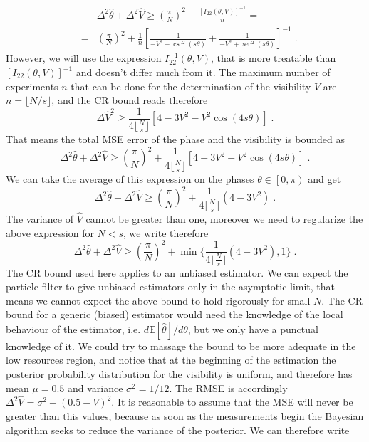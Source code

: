 \documentclass[aps, pra, 10pt, twocolumn, superscriptaddress,floatfix]{revtex4-1}
\begin{document}
%
\begin{eqnarray*}
	&& \Delta^2 \hat{\theta} + \Delta^2 \hat{V} \ge \left( \frac{\pi}{N} \right)^2 + \frac{\left[ I_{22}(\theta, V) \right]^{-1}}{n} = \\
	&=& \left( \frac{\pi}{N} \right)^2 + \frac{1}{n} \left[ \frac{1}{-V^2 + \csc^2(s \theta)} + \frac{1}{-V^2 + \sec^2(s \theta)} \right]^{-1} \; .
\end{eqnarray*}
%
However, we will use the expression $I^{-1}_{22}(\theta, V)$, that is more treatable than $\left[ I_{22}(\theta, V) \right]^{-1}$ and doesn't differ much from it. The maximum number of experiments $n$ that can be done for the determination of the visibility $V$ are $n=\lfloor N/s \rfloor$, and the CR bound reads therefore
%
\begin{equation}
	\Delta \hat{V}^2 \ge \frac{1}{4 \lfloor \frac{N}{s} \rfloor} \left[ 4 - 3 V^2 - V^2 \cos (4 s \theta) \right] \; .
\end{equation}
%
That means the total MSE error of the phase and the visibility is bounded as
%
\begin{equation}
	\Delta^2 \hat{\theta} + \Delta^2 \hat{V} \ge \left( \frac{\pi}{N} \right)^2 +  \frac{1}{4 \lfloor \frac{N}{s} \rfloor} \left[ 4 - 3 V^2 - V^2 \cos (4 s \theta) \right] \; .
\end{equation}
%
We can take the average of this expression on the phases $\theta \in \left[0, \pi \right)$ and get
%
\begin{equation}
	\Delta^2 \hat{\theta} + \Delta^2 \hat{V} \ge \left( \frac{\pi}{N} \right)^2 +  \frac{1}{4 \lfloor \frac{N}{s} \rfloor} \left( 4 - 3 V^2 \right) \; .
\end{equation}
%
The variance of $\hat{V}$ cannot be greater than one, moreover we need to regularize the above expression for $N < s$, we write therefore
%
\begin{equation}
	\Delta^2 \hat{\theta} + \Delta^2 \hat{V} \ge \left( \frac{\pi}{N} \right)^2 + \min \Big \lbrace \frac{1}{4 \lfloor \frac{N}{s} \rfloor} \left( 4 - 3 V^2 \right), 1 \Big \rbrace \; .
\end{equation}
%
The CR bound used here applies to an unbiased estimator. We can expect the particle filter to give unbiased estimators only in the asymptotic limit, that means we cannot expect the above bound to hold rigorously for small $N$. The CR bound for a generic (biased) estimator would need the knowledge of the local behaviour of the estimator, i.e. $d \mathbb{E} [\hat{\theta}] / d \theta$, but we only have a punctual knowledge of it. We could try to massage the bound to be more adequate in the low resources region, and notice that at the beginning of the estimation the posterior probability distribution for the visibility is uniform, and therefore has mean $\mu = 0.5$ and variance $\sigma^2 = 1/12$. The RMSE is accordingly $\Delta^2 \hat{V} = \sigma^2 + (0.5 - V)^2$. It is reasonable to assume that the MSE will never be greater than this values, because as soon as the measurements begin the Bayesian algorithm seeks to reduce the variance of the posterior. We can therefore write
\end{document}
